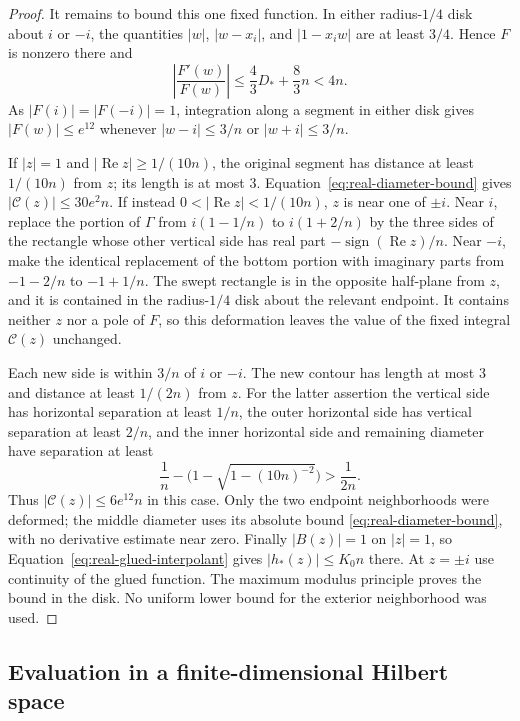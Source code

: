 \begin{proof}
It remains to bound this one fixed function.  In either radius-$1/4$
disk about $i$ or $-i$, the quantities $|w|$, $|w-x_i|$, and
$|1-x_iw|$ are at least $3/4$.  Hence $F$ is nonzero there and
\begin{equation}\label{eq:real-logarithmic-derivative}
 \left|\frac{F'(w)}{F(w)}\right|
 \le\frac43D_*+\frac83n<4n.
\end{equation}
As $|F(i)|=|F(-i)|=1$, integration along a segment in either disk
gives $|F(w)|\le e^{12}$ whenever $|w-i|\le3/n$ or
$|w+i|\le3/n$.

If $|z|=1$ and $|\operatorname{Re}z|\ge1/(10n)$, the original
segment has distance at least $1/(10n)$ from $z$; its length is at
most $3$.  Equation~\eqref{eq:real-diameter-bound} gives
$|\mathcal C(z)|\le30e^2n$.
If instead $0<|\operatorname{Re}z|<1/(10n)$, $z$ is near one
of $\pm i$.  Near $i$, replace the portion of $\Gamma$ from
$i(1-1/n)$ to $i(1+2/n)$ by the three sides of the rectangle whose
other vertical side has real part
$-\operatorname{sign}(\operatorname{Re}z)/n$.  Near $-i$, make
the identical replacement of the bottom portion with imaginary parts
from $-1-2/n$ to $-1+1/n$.  The swept rectangle is in the opposite
half-plane from $z$, and it is contained in the radius-$1/4$ disk
about the relevant endpoint.  It contains neither $z$ nor a pole of
$F$, so this deformation leaves the value of the fixed integral
$\mathcal C(z)$ unchanged.

Each new side is within $3/n$ of $i$ or $-i$.  The new contour has
length at most $3$ and distance at least $1/(2n)$ from $z$.
For the latter assertion the vertical side has horizontal separation
at least $1/n$, the outer horizontal side has vertical separation
at least $2/n$, and the inner horizontal side and remaining diameter
have separation at least
\[
 \frac1n-\bigl(1-\sqrt{1-(10n)^{-2}}\bigr)>\frac1{2n}.
\]
Thus $|\mathcal C(z)|\le6e^{12}n$ in this case.  Only the two
endpoint neighborhoods were deformed; the middle diameter uses its
absolute bound \eqref{eq:real-diameter-bound}, with no derivative
estimate near zero.  Finally $|B(z)|=1$ on $|z|=1$, so
Equation~\eqref{eq:real-glued-interpolant} gives
$|h_*(z)|\le K_0n$ there.  At $z=\pm i$ use continuity of the
glued function.  The maximum modulus principle proves the bound in
the disk.  No uniform lower bound for the exterior neighborhood was used.
\end{proof}

\subsection{Evaluation in a finite-dimensional Hilbert space}

